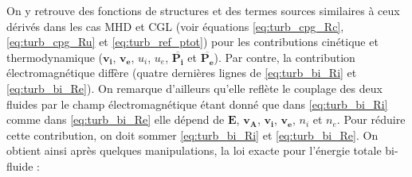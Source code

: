 On y retrouve des fonctions de structures et des termes sources similaires à ceux dérivés dans les cas \ac{MHD} et \acs{CGL} (voir équations \eqref{eq:turb_cpg_Rc}, \eqref{eq:turb_cpg_Ru} et \eqref{eq:turb_ref_ptot}) pour les contributions cinétique et thermodynamique ($\boldsymbol{v_i}$, $\boldsymbol{v_e}$, $u_i$, $u_e$, $\overline{\boldsymbol{P_i}}$ et $\overline{\boldsymbol{P_e}}$). Par contre, la contribution électromagnétique diffère (quatre dernières lignes de \eqref{eq:turb_bi_Ri} et \eqref{eq:turb_bi_Re}). On remarque d'ailleurs qu'elle reflète le couplage des deux fluides par le champ électromagnétique étant donné que dans \eqref{eq:turb_bi_Ri} comme dans \eqref{eq:turb_bi_Re} elle dépend de $\boldsymbol{E}$, $\boldsymbol{v_A}$, $\boldsymbol{v_i}$, $\boldsymbol{v_e}$, $n_i$ et $n_e$. Pour réduire cette contribution, on doit sommer \eqref{eq:turb_bi_Ri} et \eqref{eq:turb_bi_Re}. On obtient ainsi après quelques manipulations, la loi exacte pour l'énergie totale bi-fluide :
